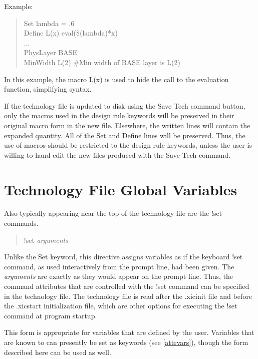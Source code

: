 Example:

\begin{quote}\rr\vt
Set lambda = .6\\
Define L(x) eval(\$(lambda)*x)\\
...\\

PhysLayer BASE\\
MinWidth L(2)  \#Min width of BASE layer is L(2)\\
\end{quote}

In this example, the macro {\vt L(x)} is used to hide the call to the
evaluation function, simplifying syntax.

If the technology file is updated to disk using the {\cb Save Tech}
command button, only the macros used in the design rule keywords will
be preserved in their original macro form in the new file.  Elsewhere,
the written lines will contain the expanded quantity.  All of the {\vt
Set} and {\vt Define} lines will be preserved.  Thus, the use of
macros should be restricted to the design rule keywords, unless the
user is willing to hand edit the new files produced with the {\cb Save
Tech} command.


\section{Technology File Global Variables}

Also typically appearing near the top of the technology file are
the {\vt !set} commands.
\begin{quote}
{\vt !set} {\it arguments}
\end{quote}
Unlike the {\vt Set} keyword, this directive assigns variables as if
the keyboard {\cb !set} command, as used interactively from the prompt
line, had been given.  The {\it arguments} are exactly as they would
appear on the prompt line.  Thus, the command attributes that are
controlled with the {\cb !set} command can be specified in the
technology file.  The technology file is read after the {\vt .xicinit}
file and before the {\vt .xicstart} initialization file, which are
other options for executing the {\cb !set} command at program startup.

This form is appropriate for variables that are defined by the user. 
Variables that are known to {\Xic} can presently be set as keywords
(see \ref{attrvars}), though the form described here can be used as
well.

